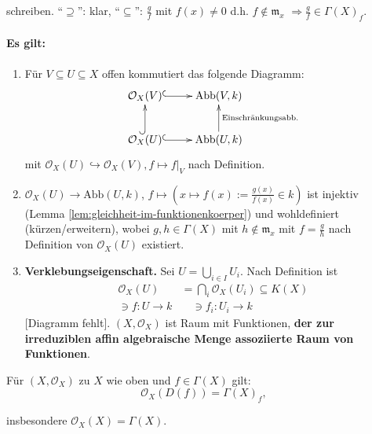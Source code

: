schreiben. ``$\supseteq$'': klar, ``$\subseteq$'': $\frac{g}{f}$
mit $f(x)\neq0$ d.h. $f\notin\mathfrak{m}_{x}$ $\Rightarrow\frac{g}{f}\in\Gamma(X)_{f}$.


\paragraph{Es gilt:}
\begin{enumerate}
\item Für $V\subseteq U\subseteq X$ offen kommutiert das folgende Diagramm:
  \[
    \xymatrix{\mathcal{O}_{X}(V)\ar@{^{(}->}[r] & \text{Abb}(V,k)\\
      \mathcal{O}_{X}(U)\ar@{^{(}->}[r]\ar@{^{(}->}[u] & \text{Abb}(U,k)\ar[u]_{\text{Einschränkungsabb.}}
    }
  \]
  mit $\mathcal{O}_{X}(U) \hookrightarrow \mathcal{O}_{X}(V), f \mapsto f|_V$ nach Definition.
\item $\mathcal{O}_{X}(U)\rightarrow\text{Abb}(U,k)$, $f\mapsto(x\mapsto f(x):=\frac{g(x)}{f(x)}\in k)$
  ist injektiv (Lemma \ref{lem:gleichheit-im-funktionenkoerper}) und wohldefiniert (kürzen/erweitern), wobei
  $g,h\in\Gamma(X)$ mit $h\notin\mathfrak{m}_{x}$ mit $f=\frac{g}{h}$
  nach Definition von $\mathcal{O}_{X}(U)$ existiert.
\item \textbf{Verklebungseigenschaft.} Sei $U=\bigcup_{i\in I}U_{i}$. Nach
  Definition ist 
  \begin{align*}
    \mathcal{O}_{X}(U) & =\bigcap_{i}\mathcal{O}_{X}(U_{i})\subseteq K(X)\\
    \ni f:U\rightarrow k & \quad\ni f_{i}:U_{i}\rightarrow k
  \end{align*}
  {[}Diagramm fehlt{]}. $(X,\mathcal{O}_{X})$ ist Raum
  mit Funktionen, \textbf{der zur irreduziblen affin algebraische Menge
    assoziierte Raum von Funktionen}. 
\end{enumerate}
\begin{prop}[orig. 33]
  \label{prop:fkt-auf-basis}
  Für $(X,\mathcal{O}_{X})$ zu $X$ wie oben und $f\in\Gamma(X)$
  gilt:
  \[
    \mathcal{O}_{X}(D(f))=\Gamma(X)_{f},
  \]

  insbesondere $\mathcal{O}_{X}(X)=\Gamma(X)$.
\end{prop}
